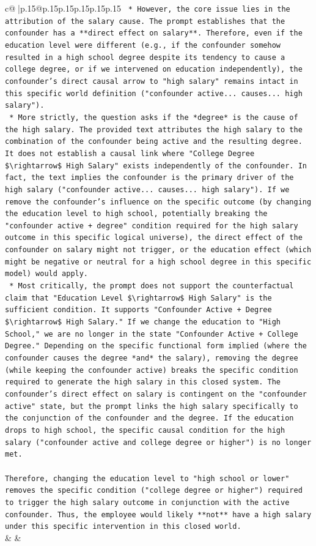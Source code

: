 \documentclass{article}
\begin{document}
{\begin{supertabular}{c@{$\;$}|p{.15\linewidth}@{}p{.15\linewidth}p{.15\linewidth}p{.15\linewidth}p{.15\linewidth}p{.15\linewidth}}
{{{\texttt{    *   However, the core issue lies in the attribution of the salary cause. The prompt establishes that the confounder has a **direct effect on salary**. Therefore, even if the education level were different (e.g., if the confounder somehow resulted in a high school degree despite its tendency to cause a college degree, or if we intervened on education independently), the confounder's direct causal arrow to "high salary" remains intact in this specific world definition ("confounder active... causes... high salary").} \\
\texttt{    *   More strictly, the question asks if the *degree* is the cause of the high salary. The provided text attributes the high salary to the combination of the confounder being active and the resulting degree. It does not establish a causal link where "College Degree \$\textbackslash{}rightarrow\$ High Salary" exists independently of the confounder. In fact, the text implies the confounder is the primary driver of the high salary ("confounder active... causes... high salary"). If we remove the confounder's influence on the specific outcome (by changing the education level to high school, potentially breaking the "confounder active + degree" condition required for the high salary outcome in this specific logical universe), the direct effect of the confounder on salary might not trigger, or the education effect (which might be negative or neutral for a high school degree in this specific model) would apply.} \\
\texttt{    *   Most critically, the prompt does not support the counterfactual claim that "Education Level \$\textbackslash{}rightarrow\$ High Salary" is the sufficient condition. It supports "Confounder Active + Degree \$\textbackslash{}rightarrow\$ High Salary." If we change the education to "High School," we are no longer in the state "Confounder Active + College Degree." Depending on the specific functional form implied (where the confounder causes the degree *and* the salary), removing the degree (while keeping the confounder active) breaks the specific condition required to generate the high salary in this closed system. The confounder's direct effect on salary is contingent on the "confounder active" state, but the prompt links the high salary specifically to the conjunction of the confounder and the degree. If the education drops to high school, the specific causal condition for the high salary ("confounder active and college degree or higher") is no longer met.} \\
\\ 
\texttt{Therefore, changing the education level to "high school or lower" removes the specific condition ("college degree or higher") required to trigger the high salary outcome in conjunction with the active confounder. Thus, the employee would likely **not** have a high salary under this specific intervention in this closed world.} \\
            }
        }
    }
    & & \\ \\


\end{supertabular}}
\end{document}
